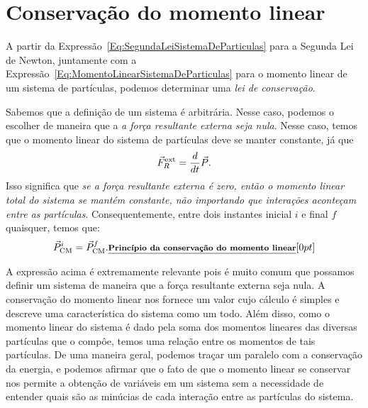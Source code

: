 

\section{Conservação do momento linear}

A partir da Expressão~\eqref{Eq:SegundaLeiSistemaDeParticulas} para a Segunda Lei de Newton, juntamente com a Expressão~\eqref{Eq:MomentoLinearSistemaDeParticulas} para o momento linear de um sistema de partículas, podemos determinar uma \emph{lei de conservação}.

Sabemos que a definição de um sistema é arbitrária. Nesse caso, podemos o escolher de maneira que a \emph{a força resultante externa seja nula}. Nesse caso, temos que o momento linear do sistema de partículas deve se manter constante, já que
\begin{equation}
	\vec{F}_R^{\rm{ext}} = \frac{d}{dt} \vec{P}.
\end{equation}
%
Isso significa que \emph{se a força resultante externa é zero, então o momento linear total do sistema se mantém constante, não importando que interações aconteçam entre as partículas}. Consequentemente, entre dois instantes inicial $i$ e final $f$ quaisquer, temos que:
\begin{equation}\label{Eq:ConservacaoMomentoLinear}
	\vec{P}_{\rm{CM}}^i = \vec{P}_{\rm{CM}}^f. \relax{\footnotesize\emph{\textbf{Princípio da conservação do momento linear}}}[0pt]
\end{equation}

A expressão acima é extremamente relevante pois é muito comum que possamos definir um sistema de maneira que a força resultante externa seja nula. A conservação do momento linear nos fornece um valor cujo cálculo é simples e descreve uma característica do sistema como um todo. Além disso, como o momento linear do sistema é dado pela soma dos momentos lineares das diversas partículas que o compôe, temos uma relação entre os momentos de tais partículas. De uma maneira geral, podemos traçar um paralelo com a conservação da energia, e podemos afirmar que o fato de que o momento linear se conservar nos permite a obtenção de variáveis em um sistema sem a necessidade de entender quais são as minúcias de cada interação entre as partículas do sistema.

